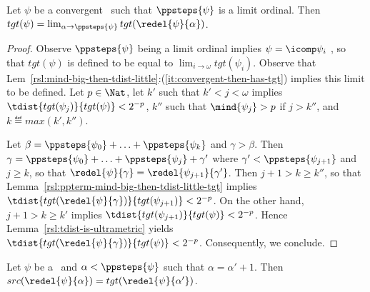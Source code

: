 \begin{lemma}
\label{rsl:ppterm-tgt-limit}
Let $\psi$ be a convergent \ppterm\ such that $\ppsteps{\psi}$ is a limit ordinal. 
Then $tgt(\psi) = \lim_{\alpha \to \ppsteps{\psi}} tgt(\redel{\psi}{\alpha})$.
\end{lemma}

\begin{proof}
Observe $\ppsteps{\psi}$ being a limit ordinal implies $\psi = \icomp \psi_i$
, so that $tgt(\psi)$ is defined to be equal to $\lim_{i \to \omega} tgt(\psi_i)$. Observe that Lem~\ref{rsl:mind-big-then-tdist-little}:(\ref{it:convergent-then-has-tgt}) implies this limit to be defined.
Let $p \in \Nat$, let $k'$ such that $k' < j < \omega$ implies $\tdist{tgt(\psi_j)}{tgt(\psi)} < 2^{-p}$, $k''$ such that $\mind{\psi_j} > p$ if $j > k''$, and $k \eqdef max(k', k'')$.

Let $\beta = \ppsteps{\psi_0} + \ldots + \ppsteps{\psi_k}$ and $\gamma > \beta$.
Then $\gamma = \ppsteps{\psi_0} + \ldots + \ppsteps{\psi_j} + \gamma'$ where $\gamma' < \ppsteps{\psi_{j+1}}$ and $j \geq k$, so that $\redel{\psi}{\gamma} = \redel{\psi_{j+1}}{\gamma'}$. 
Then $j + 1 > k \geq k''$, so that Lemma~\ref{rsl:ppterm-mind-big-then-tdist-little-tgt} implies $\tdist{tgt(\redel{\psi}{\gamma})}{tgt(\psi_{j+1})} < 2^{-p}$.
On the other hand, $j + 1 > k \geq k'$ implies $\tdist{tgt(\psi_{j+1})}{tgt(\psi)} < 2^{-p}$.
Hence Lemma~\ref{rsl:tdist-is-ultrametric} yields $\tdist{tgt(\redel{\psi}{\gamma})}{tgt(\psi)} < 2^{-p}$.
Consequently, we conclude.
\end{proof}


\begin{lemma}
\label{rsl:ppterm-tgt-src-coherence}
Let $\psi$ be a \ppterm\ and $\alpha < \ppsteps{\psi}$ such that $\alpha = \alpha' + 1$. Then $src(\redel{\psi}{\alpha}) = tgt(\redel{\psi}{\alpha'})$.
\end{lemma}

